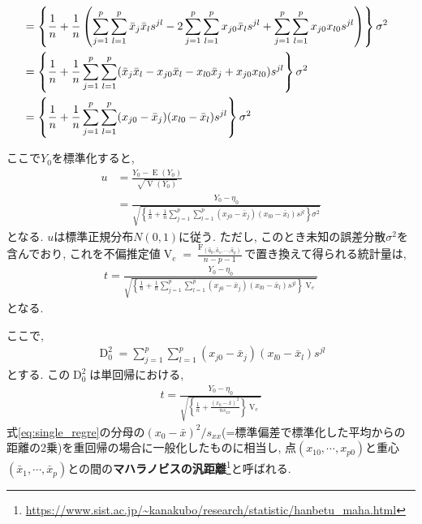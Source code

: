 \begin{align}
\begin{split}
  \end{split} \\
  \notag %
  &= \left\{
    \frac{1}{n} + \frac{1}{n}\left(
      \sum_{j=1}^p\sum_{l=1}^p\bar{x}_j\bar{x}_ls^{jl}
      -2\sum_{j=1}^p\sum_{l=1}^px_{j0}\bar{x}_ls^{jl}
      + \sum_{j=1}^p\sum_{l=1}^px_{j0}x_{l0}s^{jl}
    \right)
  \right\}\sigma^2 \\
  \notag
  &= \left\{
    \frac{1}{n} + \frac{1}{n}\sum_{j=1}^p\sum_{l=1}^p(\bar{x}_j\bar{x}_l-x_{j0}\bar{x}_l-x_{l0}\bar{x}_j+x_{j0}x_{l0})s^{jl}
  \right\}\sigma^2 \\
  \label{eq:v_y0} %
  &= \left\{
    \frac{1}{n} + \frac{1}{n}\sum_{j=1}^p\sum_{l=1}^p(x_{j0}-\bar{x}_j)(x_{l0}-\bar{x}_l)s^{jl}
  \right\}\sigma^2
\end{align}

ここで$Y_0$を標準化すると, 
\begin{align*}
  u 
  &= \frac{Y_0-\operatorname{E}(Y_0)}{\sqrt{\operatorname{V}(Y_0)}} \\
  &= \frac{Y_0-\eta_0}{\sqrt{\left\{
    \frac{1}{n} + \frac{1}{n}\sum_{j=1}^p\sum_{l=1}^p(x_{j0}-\bar{x}_j)(x_{l0}-\bar{x}_l)s^{jl}
  \right\}\sigma^2}}
\end{align*}
となる. $u$は標準正規分布$N(0, 1)$に従う. ただし, このとき未知の誤差分散$\sigma^2$を含んでおり, これを不偏推定値$\operatorname{V}_e=\frac{\operatorname{F}_(\hat{a}_0, \hat{a}_1, \cdots, \hat{a}_p)}{n-p-1}$で置き換えて得られる統計量は, 
\begin{align}
  \label{eq:stat_unbiased_estimate}
  t = \frac{Y_0-\eta_0}{\sqrt{\left\{
    \frac{1}{n} + \frac{1}{n}\sum_{j=1}^p\sum_{l=1}^p(x_{j0}-\bar{x}_j)(x_{l0}-\bar{x}_l)s^{jl}
  \right\}\operatorname{V}_e}}
\end{align}
となる. 

ここで, 
\begin{align}
  \label{eq:eq:Mahalanobis}
  \operatorname{D}_0^2
  = \sum_{j=1}^p\sum_{l=1}^p(x_{j0}-\bar{x}_j)(x_{l0}-\bar{x}_l)s^{jl}
\end{align}
とする. この$\operatorname{D}_0^2$は単回帰における, 
\begin{align}
  \label{eq:single_regre}
  t= 
  \frac{Y_0-\eta_0}
  {\sqrt{
    \left\{
      \frac{1}{n}+\frac{(x_0-\bar{x})^2}{ns_{xx}}
    \right\}\operatorname{V}_e
  }}
\end{align}
式\eqref{eq:single_regre}の分母の$(x_0-\bar{x})^2/s_{xx}$(=標準偏差で標準化した平均からの距離の2乗)を重回帰の場合に一般化したものに相当し, 点$(x_{10}, \cdots, x_{p0})$と重心$(\bar{x}_1, \cdots, \bar{x}_p)$との間の{\bf マハラノビスの汎距離}\footnote{\url{https://www.sist.ac.jp/~kanakubo/research/statistic/hanbetu_maha.html}}と呼ばれる. 


